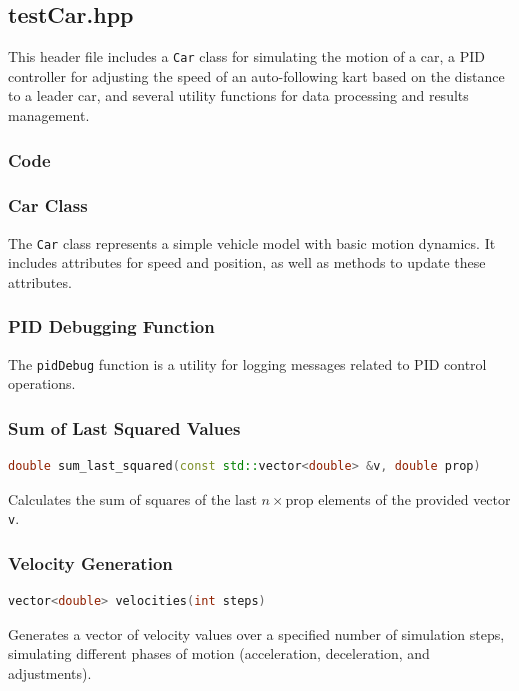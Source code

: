 \documentclass[a4paper,12pt]{./article}
\begin{document}
\subsection{testCar.hpp}
This header file includes a \texttt{Car} class for simulating the motion of a car, a PID controller for adjusting the speed of an auto-following kart based on the distance to a leader car, and several utility functions for data processing and results management.
\subsubsection{Code}

\subsubsection{Car Class}
The \texttt{Car} class represents a simple vehicle model with basic motion dynamics. It includes attributes for speed and position, as well as methods to update these attributes.
\subsubsection{PID Debugging Function}
The \texttt{pidDebug} function is a utility for logging messages related to PID control operations.
\subsubsection{Sum of Last Squared Values}
\begin{lstlisting}[language=C++]
double sum_last_squared(const std::vector<double> &v, double prop)
\end{lstlisting}
Calculates the sum of squares of the last $n \times \text{prop}$ elements of the provided vector \texttt{v}.
\subsubsection{Velocity Generation}
\begin{lstlisting}[language=C++]
vector<double> velocities(int steps)
\end{lstlisting}
Generates a vector of velocity values over a specified number of simulation steps, simulating different phases of motion (acceleration, deceleration, and adjustments).
\end{document}

